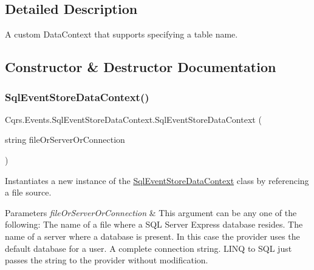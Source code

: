 \subsection{Detailed Description}
A custom Data\+Context that supports specifying a table name. 



\subsection{Constructor \& Destructor Documentation}
\mbox{\label{classCqrs_1_1Events_1_1SqlEventStoreDataContext_a2b12344967911de04dbbb9c24150cfe6_a2b12344967911de04dbbb9c24150cfe6}} 
\subsubsection{\texorpdfstring{Sql\+Event\+Store\+Data\+Context()}{SqlEventStoreDataContext()}\hspace{0.1cm}{\footnotesize\ttfamily [1/2]}}
{\footnotesize\ttfamily Cqrs.\+Events.\+Sql\+Event\+Store\+Data\+Context.\+Sql\+Event\+Store\+Data\+Context (\begin{DoxyParamCaption}\item[{string}]{file\+Or\+Server\+Or\+Connection }\end{DoxyParamCaption})}



Instantiates a new instance of the \hyperlink{classCqrs_1_1Events_1_1SqlEventStoreDataContext}{Sql\+Event\+Store\+Data\+Context} class by referencing a file source. 


\begin{DoxyParams}{Parameters}
{\em file\+Or\+Server\+Or\+Connection} & This argument can be any one of the following\+: The name of a file where a S\+QL Server Express database resides. The name of a server where a database is present. In this case the provider uses the default database for a user. A complete connection string. L\+I\+NQ to S\+QL just passes the string to the provider without modification. \\
\hline
\end{DoxyParams}
\mbox{\label{classCqrs_1_1Events_1_1SqlEventStoreDataContext_aaa1706a1cff7c264688b6755ab842dad_aaa1706a1cff7c264688b6755ab842dad}} 
